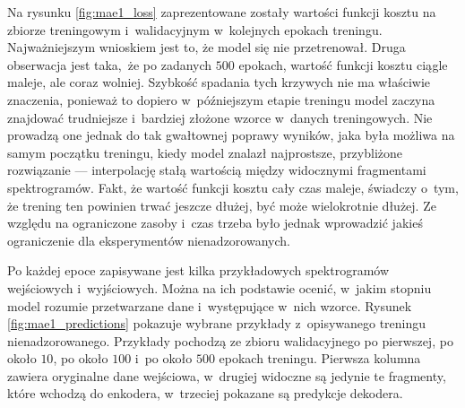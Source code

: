 Na rysunku \ref{fig:mae1_loss} zaprezentowane zostały wartości funkcji kosztu na zbiorze treningowym i~walidacyjnym w~kolejnych epokach treningu. Najważniejszym wnioskiem jest to, że model się nie przetrenował. Druga obserwacja jest taka, że po zadanych $500$ epokach, wartość funkcji kosztu ciągle maleje, ale coraz wolniej. Szybkość spadania tych krzywych nie ma właściwie znaczenia, ponieważ to dopiero w~późniejszym etapie treningu model zaczyna znajdować trudniejsze i~bardziej złożone wzorce w~danych treningowych. Nie prowadzą one jednak do tak gwałtownej poprawy wyników, jaka była możliwa na samym początku treningu, kiedy model znalazł najprostsze, przybliżone rozwiązanie --- interpolację stałą wartością między widocznymi fragmentami spektrogramów. Fakt, że wartość funkcji kosztu cały czas maleje, świadczy o~tym, że trening ten powinien trwać jeszcze dłużej, być może wielokrotnie dłużej. Ze względu na ograniczone zasoby i~czas trzeba było jednak wprowadzić jakieś ograniczenie dla eksperymentów nienadzorowanych.

Po każdej epoce zapisywane jest kilka przykładowych spektrogramów wejściowych i~wyjściowych. Można na ich podstawie ocenić, w~jakim stopniu model rozumie przetwarzane dane i~występujące w~nich wzorce. Rysunek \ref{fig:mae1_predictions} pokazuje wybrane przykłady z~opisywanego treningu nienadzorowanego. Przykłady pochodzą ze zbioru walidacyjnego po pierwszej, po około $10$, po około $100$ i~po około $500$ epokach treningu. Pierwsza kolumna zawiera oryginalne dane wejściowa, w~drugiej widoczne są jedynie te fragmenty, które wchodzą do enkodera, w~trzeciej pokazane są predykcje dekodera.

